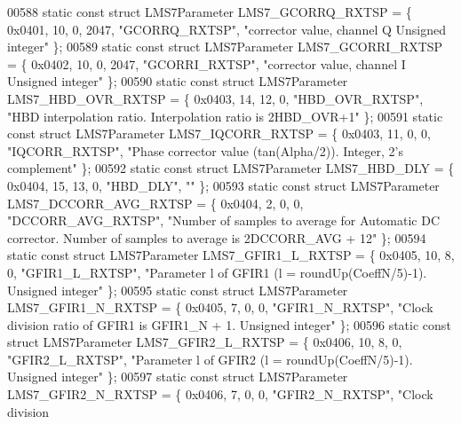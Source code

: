 \begin{DoxyCode}
00588 \textcolor{keyword}{static} \textcolor{keyword}{const} \textcolor{keyword}{struct }LMS7Parameter LMS7_GCORRQ_RXTSP = \{ 0x0401, 10, 0, 2047, \textcolor{stringliteral}{"GCORRQ\_RXTSP"}, \textcolor{stringliteral}{"corrector
       value, channel Q Unsigned integer"} \};
00589 \textcolor{keyword}{static} \textcolor{keyword}{const} \textcolor{keyword}{struct }LMS7Parameter LMS7_GCORRI_RXTSP = \{ 0x0402, 10, 0, 2047, \textcolor{stringliteral}{"GCORRI\_RXTSP"}, \textcolor{stringliteral}{"corrector
       value, channel I Unsigned integer"} \};
00590 \textcolor{keyword}{static} \textcolor{keyword}{const} \textcolor{keyword}{struct }LMS7Parameter LMS7_HBD_OVR_RXTSP = \{ 0x0403, 14, 12, 0, \textcolor{stringliteral}{"HBD\_OVR\_RXTSP"}, \textcolor{stringliteral}{"HBD
       interpolation ratio. Interpolation ratio is 2HBD\_OVR+1"} \};
00591 \textcolor{keyword}{static} \textcolor{keyword}{const} \textcolor{keyword}{struct }LMS7Parameter LMS7_IQCORR_RXTSP = \{ 0x0403, 11, 0, 0, \textcolor{stringliteral}{"IQCORR\_RXTSP"}, \textcolor{stringliteral}{"Phase corrector
       value (tan(Alpha/2)). Integer, 2's complement"} \};
00592 \textcolor{keyword}{static} \textcolor{keyword}{const} \textcolor{keyword}{struct }LMS7Parameter LMS7_HBD_DLY = \{ 0x0404, 15, 13, 0, \textcolor{stringliteral}{"HBD\_DLY"}, \textcolor{stringliteral}{""} \};
00593 \textcolor{keyword}{static} \textcolor{keyword}{const} \textcolor{keyword}{struct }LMS7Parameter LMS7_DCCORR_AVG_RXTSP = \{ 0x0404, 2, 0, 0, \textcolor{stringliteral}{"DCCORR\_AVG\_RXTSP"}, \textcolor{stringliteral}{"Number of
       samples to average for Automatic DC corrector. Number of samples to average is 2DCCORR\_AVG + 12"} \};
00594 \textcolor{keyword}{static} \textcolor{keyword}{const} \textcolor{keyword}{struct }LMS7Parameter LMS7_GFIR1_L_RXTSP = \{ 0x0405, 10, 8, 0, \textcolor{stringliteral}{"GFIR1\_L\_RXTSP"}, \textcolor{stringliteral}{"Parameter l of
       GFIR1 (l = roundUp(CoeffN/5)-1). Unsigned integer"} \};
00595 \textcolor{keyword}{static} \textcolor{keyword}{const} \textcolor{keyword}{struct }LMS7Parameter LMS7_GFIR1_N_RXTSP = \{ 0x0405, 7, 0, 0, \textcolor{stringliteral}{"GFIR1\_N\_RXTSP"}, \textcolor{stringliteral}{"Clock division
       ratio of GFIR1 is GFIR1\_N + 1. Unsigned integer"} \};
00596 \textcolor{keyword}{static} \textcolor{keyword}{const} \textcolor{keyword}{struct }LMS7Parameter LMS7_GFIR2_L_RXTSP = \{ 0x0406, 10, 8, 0, \textcolor{stringliteral}{"GFIR2\_L\_RXTSP"}, \textcolor{stringliteral}{"Parameter l of
       GFIR2 (l = roundUp(CoeffN/5)-1). Unsigned integer"} \};
00597 \textcolor{keyword}{static} \textcolor{keyword}{const} \textcolor{keyword}{struct }LMS7Parameter LMS7_GFIR2_N_RXTSP = \{ 0x0406, 7, 0, 0, \textcolor{stringliteral}{"GFIR2\_N\_RXTSP"}, \textcolor{stringliteral}{"Clock division
}
\end{DoxyCode}
